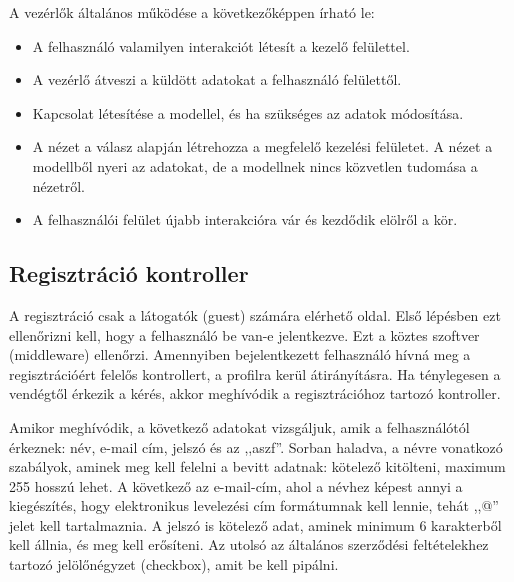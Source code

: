 \documentclass[
]{thesis-ekf}
\theoremstyle{definition}
\theoremstyle{remark}
\begin{document}
	A vezérlők általános működése a következőképpen írható le:
	\begin{itemize}
		\item{A felhasználó valamilyen interakciót létesít a kezelő felülettel.}
		\item{A vezérlő átveszi a küldött adatokat a felhasználó felülettől.}
		\item{Kapcsolat létesítése a modellel, és ha szükséges az adatok módosítása.}
		\item{ A nézet a válasz alapján létrehozza a megfelelő kezelési felületet. A nézet a modellből nyeri az adatokat, de a modellnek nincs közvetlen tudomása a nézetről.}
		\item{A felhasználói felület újabb interakcióra vár és kezdődik elölről a kör.}~\cite{controller_cicle}
	\end{itemize}
	
	\subsection{Regisztráció kontroller}
	A regisztráció csak a látogatók (guest) számára elérhető oldal. Első lépésben ezt ellenőrizni kell, hogy a felhasználó be van-e jelentkezve. Ezt a köztes szoftver (middleware) ellenőrzi. Amennyiben bejelentkezett felhasználó hívná meg a regisztrációért felelős kontrollert, a profilra kerül átirányításra. Ha ténylegesen a vendégtől érkezik a kérés, akkor meghívódik a regisztrációhoz tartozó kontroller.  
	
	Amikor meghívódik, a következő adatokat vizsgáljuk, amik a felhasználótól érkeznek: név, e-mail cím, jelszó és az ,,aszf''.
	Sorban haladva, a névre vonatkozó szabályok, aminek meg kell felelni a bevitt adatnak: kötelező kitölteni, maximum 255 hosszú lehet. A következő az e-mail-cím, ahol a névhez képest annyi a kiegészítés, hogy elektronikus levelezési cím formátumnak kell lennie, tehát ,,@'' jelet kell tartalmaznia.
	A jelszó is kötelező adat, aminek minimum 6 karakterből kell állnia, és meg kell erősíteni. Az utolsó az általános szerződési feltételekhez tartozó jelölőnégyzet (checkbox), amit be kell pipálni.
	
\end{document}
